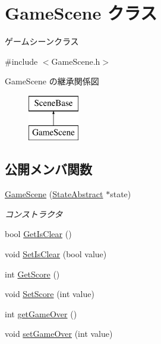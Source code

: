 \hypertarget{class_game_scene}{}\section{Game\+Scene クラス}
\label{class_game_scene}


ゲームシーンクラス  




{\ttfamily \#include $<$Game\+Scene.\+h$>$}

Game\+Scene の継承関係図\begin{figure}[H]
\begin{center}
\leavevmode
\includegraphics[height=2.000000cm]{class_game_scene}
\end{center}
\end{figure}
\subsection*{公開メンバ関数}
\begin{DoxyCompactItemize}
\item 
\mbox{\hyperlink{class_game_scene_a7c9e00b7dddd016d9c07f8cb49e7bbb2}{Game\+Scene}} (\mbox{\hyperlink{class_scene_base_1_1_state_abstract}{State\+Abstract}} $\ast$state)
\begin{DoxyCompactList}\small\item\em コンストラクタ \end{DoxyCompactList}\item 
bool \mbox{\hyperlink{class_game_scene_afb9c99f2e9b94bfc4f151bed83b1a522}{Get\+Is\+Clear}} ()
\item 
void \mbox{\hyperlink{class_game_scene_aac6f0f69d7ad5745e49f41425d7df793}{Set\+Is\+Clear}} (bool value)
\item 
int \mbox{\hyperlink{class_game_scene_a903dffd64231c226daf27f22893893d8}{Get\+Score}} ()
\item 
void \mbox{\hyperlink{class_game_scene_aec5425818644ea2cb22ccffc89c56378}{Set\+Score}} (int value)
\item 
int \mbox{\hyperlink{class_game_scene_a2f8413f473bc9a937fa02bfd4678d61d}{get\+Game\+Over}} ()
\item 
void \mbox{\hyperlink{class_game_scene_abaefc8ae1bd5625d79da25120ef33a8e}{set\+Game\+Over}} (int value)
\end{DoxyCompactItemize}


